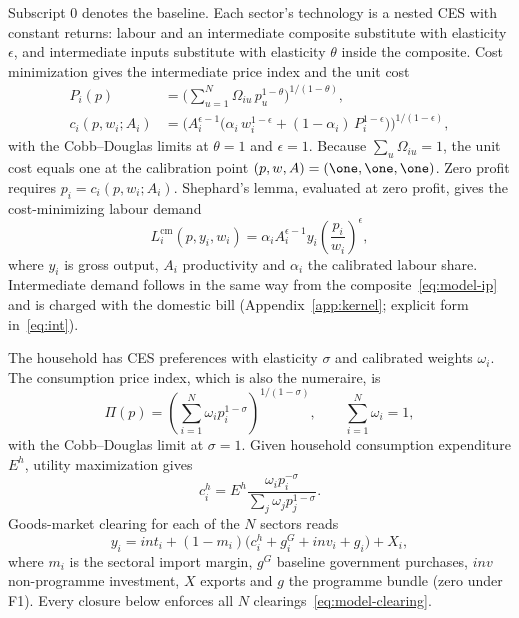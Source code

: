 Subscript $0$ denotes the baseline. Each sector's technology is a nested CES
with constant returns: labour and an intermediate composite substitute with
elasticity $\epsilon$, and intermediate inputs substitute with elasticity
$\theta$ inside the composite. Cost minimization gives the intermediate
price index and the unit cost
\begin{align}
P_i(p) &= \Big(\textstyle\sum_{u=1}^N \Omega_{iu}\,p_u^{1-\theta}\Big)^{1/(1-\theta)},
\label{eq:model-ip}\\
c_i(p,w_i;A_i) &= \Big(A_i^{\epsilon-1}\big(\alpha_i\,w_i^{1-\epsilon}
  + (1-\alpha_i)\,P_i^{1-\epsilon}\big)\Big)^{1/(1-\epsilon)},
\label{eq:model-cost}
\end{align}
with the Cobb--Douglas limits at $\theta=1$ and $\epsilon=1$. Because
$\sum_u\Omega_{iu}=1$, the unit cost equals one at the calibration point
$(p,w,A)=(\one,\one,\one)$. Zero profit requires $p_i = c_i(p,w_i;A_i)$.
Shephard's lemma, evaluated at zero profit, gives the cost-minimizing
labour demand
\begin{equation}
L_i^{\mathrm{cm}}(p,y_i,w_i)
 = \alpha_i A_i^{\epsilon-1} y_i
   \left(\frac{p_i}{w_i}\right)^{\epsilon},
\label{eq:closure-labour-demand}
\end{equation}
where $y_i$ is gross output, $A_i$ productivity and $\alpha_i$ the calibrated
labour share. Intermediate demand follows in the same way from the
composite~\eqref{eq:model-ip} and is charged with the domestic bill
(Appendix~\ref{app:kernel}; explicit form in~\eqref{eq:int}).

The household has CES preferences with elasticity $\sigma$ and calibrated
weights $\omega_i$. The consumption price index, which is also the
numeraire, is
\begin{equation}
  \Pi(p) = \left(\sum_{i=1}^N \omega_i p_i^{1-\sigma}\right)^{1/(1-\sigma)},
  \qquad \sum_{i=1}^N \omega_i = 1,
  \label{eq:labour-cpi}
\end{equation}
with the Cobb--Douglas limit at $\sigma = 1$. Given household consumption
expenditure $E^h$, utility maximization gives
\begin{equation}
c_i^h = E^h\frac{\omega_i p_i^{-\sigma}}{\sum_j\omega_j p_j^{1-\sigma}}.
\label{eq:model-household}
\end{equation}
Goods-market clearing for each of the $N$ sectors reads
\begin{equation}
y_i = \mathit{int}_i + (1-m_i)\big(c_i^h + g_i^G + \mathit{inv}_i + g_i\big) + X_i,
\label{eq:model-clearing}
\end{equation}
where $m_i$ is the sectoral import margin, $g^G$ baseline government
purchases, $\mathit{inv}$ non-programme investment, $X$ exports and $g$ the
programme bundle (zero under F1). Every closure below enforces all $N$
clearings~\eqref{eq:model-clearing}.

